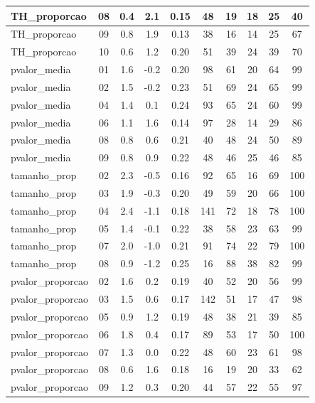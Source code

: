 \documentclass[a4paper]{report}
\begin{document}
\begin{longtable}{l|c|c|c|c|c|c|c|c|c}
\hline
TH\_proporcao & 08 & 0.4 & 2.1 & 0.15 & 48 & 19 & 18 & 25 & 40\\
\hline
TH\_proporcao & 09 & 0.8 & 1.9 & 0.13 & 38 & 16 & 14 & 25 & 67\\
\hline
TH\_proporcao & 10 & 0.6 & 1.2 & 0.20 & 51 & 39 & 24 & 39 & 70\\
\hline
pvalor\_media & 01 & 1.6 & -0.2 & 0.20 & 98 & 61 & 20 & 64 & 99\\
\hline
pvalor\_media & 02 & 1.5 & -0.2 & 0.23 & 51 & 69 & 24 & 65 & 99\\
\hline
pvalor\_media & 04 & 1.4 & 0.1 & 0.24 & 93 & 65 & 24 & 60 & 99\\
\hline
pvalor\_media & 06 & 1.1 & 1.6 & 0.14 & 97 & 28 & 14 & 29 & 86\\
\hline
pvalor\_media & 08 & 0.8 & 0.6 & 0.21 & 40 & 48 & 24 & 50 & 89\\
\hline
pvalor\_media & 09 & 0.8 & 0.9 & 0.22 & 48 & 46 & 25 & 46 & 85\\
\hline
tamanho\_prop & 02 & 2.3 & -0.5 & 0.16 & 92 & 65 & 16 & 69 & 100\\
\hline
tamanho\_prop & 03 & 1.9 & -0.3 & 0.20 & 49 & 59 & 20 & 66 & 100\\
\hline
tamanho\_prop & 04 & 2.4 & -1.1 & 0.18 & 141 & 72 & 18 & 78 & 100\\
\hline
tamanho\_prop & 05 & 1.4 & -0.1 & 0.22 & 38 & 58 & 23 & 63 & 99\\
\hline
tamanho\_prop & 07 & 2.0 & -1.0 & 0.21 & 91 & 74 & 22 & 79 & 100\\
\hline
tamanho\_prop & 08 & 0.9 & -1.2 & 0.25 & 16 & 88 & 38 & 82 & 99\\
\hline
pvalor\_proporcao & 02 & 1.6 & 0.2 & 0.19 & 40 & 52 & 20 & 56 & 99\\
\hline
pvalor\_proporcao & 03 & 1.5 & 0.6 & 0.17 & 142 & 51 & 17 & 47 & 98\\
\hline
pvalor\_proporcao & 05 & 0.9 & 1.2 & 0.19 & 48 & 38 & 21 & 39 & 85\\
\hline
pvalor\_proporcao & 06 & 1.8 & 0.4 & 0.17 & 89 & 53 & 17 & 50 & 100\\
\hline
pvalor\_proporcao & 07 & 1.3 & 0.0 & 0.22 & 48 & 60 & 23 & 61 & 98\\
\hline
pvalor\_proporcao & 08 & 0.6 & 1.6 & 0.18 & 16 & 19 & 20 & 33 & 62\\
\hline
pvalor\_proporcao & 09 & 1.2 & 0.3 & 0.20 & 44 & 57 & 22 & 55 & 97\\
\hline
\end{longtable}
\end{document}
